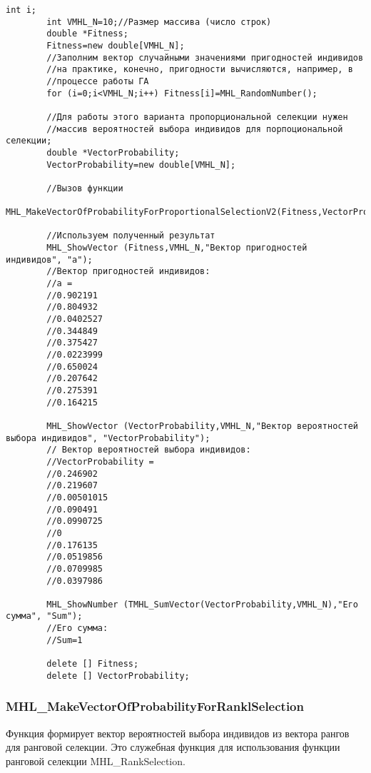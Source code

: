 \documentclass[a4paper,12pt]{article}
\begin{document}
\begin{lstlisting}[label=code_use_MHL_MakeVectorOfProbabilityForProportionalSelectionV2,caption=Пример использования]
        int i;
        int VMHL_N=10;//Размер массива (число строк)
        double *Fitness;
        Fitness=new double[VMHL_N];
        //Заполним вектор случайными значениями пригодностей индивидов
        //на практике, конечно, пригодности вычисляются, например, в
        //процессе работы ГА
        for (i=0;i<VMHL_N;i++) Fitness[i]=MHL_RandomNumber();

        //Для работы этого варианта пропорциональной селекции нужен
        //массив вероятностей выбора индивидов для порпоциональной селекции;
        double *VectorProbability;
        VectorProbability=new double[VMHL_N];

        //Вызов функции
        MHL_MakeVectorOfProbabilityForProportionalSelectionV2(Fitness,VectorProbability,VMHL_N);

        //Используем полученный результат
        MHL_ShowVector (Fitness,VMHL_N,"Вектор пригодностей индивидов", "a");
        //Вектор пригодностей индивидов:
        //a =	
        //0.902191
        //0.804932
        //0.0402527
        //0.344849
        //0.375427
        //0.0223999
        //0.650024
        //0.207642
        //0.275391
        //0.164215
        
        MHL_ShowVector (VectorProbability,VMHL_N,"Вектор вероятностей выбора индивидов", "VectorProbability");
        // Вектор вероятностей выбора индивидов:
        //VectorProbability =	
        //0.246902
        //0.219607
        //0.00501015
        //0.090491
        //0.0990725
        //0
        //0.176135
        //0.0519856
        //0.0709985
        //0.0397986

        MHL_ShowNumber (TMHL_SumVector(VectorProbability,VMHL_N),"Его сумма", "Sum");
        //Его сумма:
        //Sum=1

        delete [] Fitness;
        delete [] VectorProbability;
\end{lstlisting}

\subsubsection{MHL\_MakeVectorOfProbabilityForRanklSelection}\label{MHL_MakeVectorOfProbabilityForRanklSelection}

Функция формирует вектор вероятностей выбора индивидов из вектора рангов для ранговой селекции. Это служебная функция для использования функции ранговой селекции MHL\_RankSelection.
\end{document}
